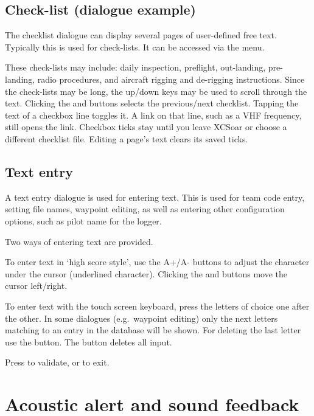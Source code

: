 \subsection*{Check-list (dialogue example)}\label{sec:checklist}

The checklist dialogue can display several pages of user-defined free text.
Typically this is used for check-lists. It can be accessed via the menu.

\blink{}

These check-lists may include: daily inspection, preflight,
out-landing, pre-landing, radio procedures, and aircraft rigging and
de-rigging instructions.  Since the check-lists may be long, the
up/down keys may be used to scroll through the text. Clicking the
\bmenuw{$<$} and \bmenuw{$>$} buttons selects the previous/next
checklist.  Tapping the text of a checkbox line toggles it.  A link
on that line, such as a VHF frequency, still opens the link.
Checkbox ticks stay until you leave XCSoar or choose a
different checklist file. Editing a page's text clears its saved ticks.


\subsection*{Text entry} \label{sec:textentry}

A text entry dialogue is used for entering text.  This is used for team
code entry, setting file names, waypoint editing, as well as entering
other configuration options, such as pilot name for the logger.

Two ways of entering text are provided. 

To enter text in `high score style', use the A+/A- buttons to adjust the 
character under the cursor (underlined character). Clicking the \button{$<$} 
and \button{$>$} buttons move the cursor left/right.  

To enter text with the touch screen keyboard, press the letters of choice 
one after the other. In some dialogues (e.g.\ waypoint editing) only the next
letters matching to an entry in the database will be shown. For deleting the 
last letter use the \button{$<-$} button. The  button deletes all input.

Press  to validate, or  to exit.


\section{Acoustic alert and sound feedback}

